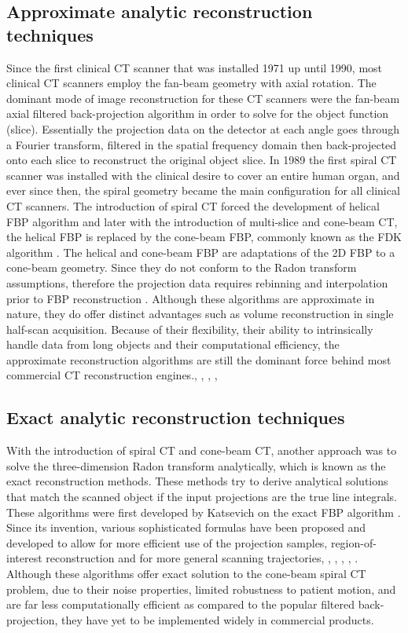 \subsection{Approximate analytic reconstruction techniques}
Since the first clinical CT scanner that was installed 1971 up until 1990, most clinical CT scanners employ the fan-beam geometry with axial rotation.  The dominant mode of image reconstruction for these CT scanners were the fan-beam axial filtered back-projection algorithm in order to solve for the object function (slice).  Essentially the projection data on the detector at each angle goes through a Fourier transform, filtered in the spatial frequency domain then back-projected onto each slice to reconstruct the original object slice.  In 1989 the first spiral CT scanner was installed with the clinical desire to cover an entire human organ, and ever since then, the spiral geometry became the main configuration for all clinical CT scanners.  The introduction of spiral CT forced the development of helical FBP algorithm and later with the introduction of multi-slice and cone-beam CT, the helical FBP is replaced by the cone-beam FBP, commonly known as the FDK algorithm \citep{Feldkamp1984}.  The helical and cone-beam FBP are adaptations of the 2D FBP to a cone-beam geometry.  Since they do not conform to the Radon transform assumptions, therefore the projection data requires rebinning and interpolation prior to FBP reconstruction
.  Although these algorithms are approximate in nature, they do offer distinct advantages such as volume reconstruction in single half-scan acquisition.  Because of their flexibility, their ability to intrinsically handle data from long objects and their computational efficiency, the approximate reconstruction algorithms are still the dominant force behind most commercial CT reconstruction engines.\citep{Wang1993}, \citep{Hsieh}, \citep{Hsieh2007}, \citep{Tang2006}, \citep{Silver1998}

\subsection{Exact analytic reconstruction techniques}
With the introduction of spiral CT and cone-beam CT, another approach was to solve the three-dimension Radon transform analytically, which is known as the exact reconstruction methods.  These methods try to derive analytical solutions that match the scanned object if the input projections are the true line integrals. These algorithms were first developed by Katsevich on the exact FBP algorithm \citep{Katsevich2002} \citep{Katsevich2003} \citep{Katsevich2002SIAM}.  Since its invention, various sophisticated formulas have been proposed and developed to allow for more efficient use of the projection samples, region-of-interest reconstruction and for more general scanning trajectories\citep{Chen2003}, \citep{Pan2004}, \citep{Zou2004}, \citep{Ye2005}, \citep{Zhuang2006}, \citep{Wang2008}.  Although these algorithms offer exact solution to the cone-beam spiral CT problem, due to their noise properties, limited robustness to patient motion, and are far less computationally efficient as compared to the popular filtered back-projection, they have yet to be implemented widely in commercial products.

